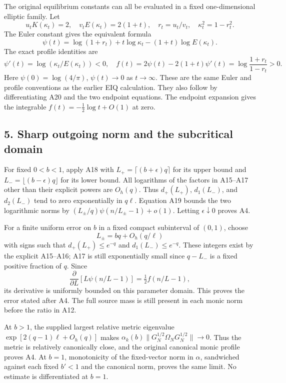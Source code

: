 \documentclass[11pt]{article}
\begin{document}
The original equilibrium constants can all be evaluated in a fixed one-dimensional elliptic family. Let \[
 u_tK(\kappa_t)=2,\quad
 v_tE(\kappa_t)=2(1+t),\quad
 r_t=u_t/v_t,\quad \kappa_t^2=1-r_t^2.
\] The Euler constant gives the equivalent formula \[
 \psi(t)=\log(1+r_t)+t\log\kappa_t-(1+t)\log E(\kappa_t).
 \tag{A20}
\] The exact profile identities are \[
 \psi'(t)=\log(\kappa_t/E(\kappa_t))<0,\quad
 f(t)=2\psi(t)-2(1+t)\psi'(t)
     =\log\frac{1+r_t}{1-r_t}>0.
 \tag{A21}
\] Here \(\psi(0)=\log(4/\pi)\), \(\psi(t)\to0\) as \(t\to\infty\). These are the same Euler and profile conventions as the earlier EIQ calculation. They also follow by differentiating A20 and the two endpoint equations. The endpoint expansion gives the integrable \(f(t)=-\frac12\log t+O(1)\) at zero.

\subsection{5. Sharp outgoing norm and the subcritical domain}\label{sharp-outgoing-norm-and-the-subcritical-domain}

For fixed \(0<b<1\), apply A18 with \(L_+=\lceil(b+\epsilon)q\rceil\) for its upper bound and \(L_-=\lfloor(b-\epsilon)q\rfloor\) for its lower bound. All logarithms of the factors in A15--A17 other than their explicit powers are \(O_h(q)\). Thus \(d_+(L_+)\), \(d_1(L_-)\), and \(d_2(L_-)\) tend to zero exponentially in \(q\ell\). Equation A19 bounds the two logarithmic norms by \((L_\pm/q)\psi(n/L_\pm-1)+o(1)\). Letting \(\epsilon\downarrow0\) proves A4.

For a finite uniform error on \(b\) in a fixed compact subinterval of \((0,1)\), choose \[
 L_\pm=bq+O_h(q/\ell)
\] with signs such that \(d_+(L_+)\le e^{-q}\) and \(d_1(L_-)\le e^{-q}\). These integers exist by the explicit A15--A16; A17 is still exponentially small since \(q-L_-\) is a fixed positive fraction of \(q\). Since \[
 \frac{\partial}{\partial L}
      [L\psi(n/L-1)]=\tfrac12f(n/L-1),
\] its derivative is uniformly bounded on this parameter domain. This proves the error stated after A4. The full source mass is still present in each monic norm before the ratio in A12.

At \(b>1\), the supplied largest relative metric eigenvalue \(\exp[2(q-1)\ell+O_h(q)]\) makes \(\alpha_k(b)\|G_N^{1/2}\Omega_NG_N^{1/2}\|\to0\). Thus the metric is relatively canonically close, and the original canonical monic profile proves A4. At \(b=1\), monotonicity of the fixed-vector norm in \(\alpha\), sandwiched against each fixed \(b'<1\) and the canonical norm, proves the same limit. No estimate is differentiated at \(b=1\).
\end{document}
